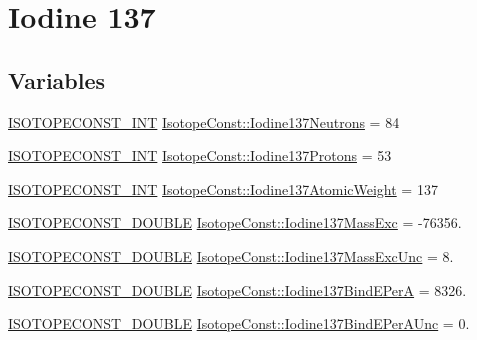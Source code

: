 \hypertarget{group___isotope_const-_iodine-_i137}{}\section{Iodine 137}
\label{group___isotope_const-_iodine-_i137}
\subsection*{Variables}
\begin{DoxyCompactItemize}
\item 
\mbox{\hyperlink{group___isotope_const-_macros_ga5f18360b3e99483a35c32d789e62621c}{I\+S\+O\+T\+O\+P\+E\+C\+O\+N\+S\+T\+\_\+\+I\+NT}} \mbox{\hyperlink{group___isotope_const-_iodine-_i137_ga399d2bc6a6edae5814cd8c199d2068dd}{Isotope\+Const\+::\+Iodine137\+Neutrons}} = 84
\item 
\mbox{\hyperlink{group___isotope_const-_macros_ga5f18360b3e99483a35c32d789e62621c}{I\+S\+O\+T\+O\+P\+E\+C\+O\+N\+S\+T\+\_\+\+I\+NT}} \mbox{\hyperlink{group___isotope_const-_iodine-_i137_ga7cb2dbeffda53484f898138b824beb93}{Isotope\+Const\+::\+Iodine137\+Protons}} = 53
\item 
\mbox{\hyperlink{group___isotope_const-_macros_ga5f18360b3e99483a35c32d789e62621c}{I\+S\+O\+T\+O\+P\+E\+C\+O\+N\+S\+T\+\_\+\+I\+NT}} \mbox{\hyperlink{group___isotope_const-_iodine-_i137_gab9cda7233e32a96f05a98c6e665325cf}{Isotope\+Const\+::\+Iodine137\+Atomic\+Weight}} = 137
\item 
\mbox{\hyperlink{group___isotope_const-_macros_ga8f45a7272ce02c0b4c65c44636ed719a}{I\+S\+O\+T\+O\+P\+E\+C\+O\+N\+S\+T\+\_\+\+D\+O\+U\+B\+LE}} \mbox{\hyperlink{group___isotope_const-_iodine-_i137_gaf8f7dd18d5c830c3c3ed383bfd9029b5}{Isotope\+Const\+::\+Iodine137\+Mass\+Exc}} = -\/76356.
\item 
\mbox{\hyperlink{group___isotope_const-_macros_ga8f45a7272ce02c0b4c65c44636ed719a}{I\+S\+O\+T\+O\+P\+E\+C\+O\+N\+S\+T\+\_\+\+D\+O\+U\+B\+LE}} \mbox{\hyperlink{group___isotope_const-_iodine-_i137_ga45bf17a2c9ddf7263057812db72d8f90}{Isotope\+Const\+::\+Iodine137\+Mass\+Exc\+Unc}} = 8.
\item 
\mbox{\hyperlink{group___isotope_const-_macros_ga8f45a7272ce02c0b4c65c44636ed719a}{I\+S\+O\+T\+O\+P\+E\+C\+O\+N\+S\+T\+\_\+\+D\+O\+U\+B\+LE}} \mbox{\hyperlink{group___isotope_const-_iodine-_i137_ga6ad29848c1ad0d6d7864dcc76e091cf2}{Isotope\+Const\+::\+Iodine137\+Bind\+E\+PerA}} = 8326.
\item 
\mbox{\hyperlink{group___isotope_const-_macros_ga8f45a7272ce02c0b4c65c44636ed719a}{I\+S\+O\+T\+O\+P\+E\+C\+O\+N\+S\+T\+\_\+\+D\+O\+U\+B\+LE}} \mbox{\hyperlink{group___isotope_const-_iodine-_i137_gae96985474a89b35c42bded7ed9322cec}{Isotope\+Const\+::\+Iodine137\+Bind\+E\+Per\+A\+Unc}} = 0.

\end{DoxyCompactItemize}
